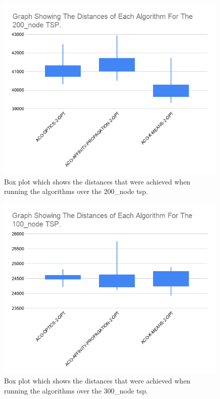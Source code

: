 \begin{figure}
    \centering
    \includegraphics[width=\textwidth]{figures/tsp_distance_200_node_graph.png}
    \caption{Box plot which shows the distances that were achieved when running the algorithms over the 200\_node tsp.}
    \label{fig:tsp_distance_200_node_graph}
\end{figure}

\begin{figure}
    \centering
    \includegraphics[width=\textwidth]{figures/tsp_distance_100_node_graph.png}
    \caption{Box plot which shows the distances that were achieved when running the algorithms over the 300\_node tsp.}
    \label{fig:tsp_distance_300_node_graph}
\end{figure}

